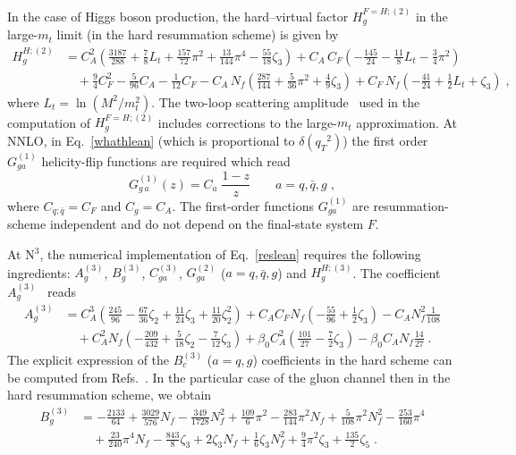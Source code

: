 \documentclass[12pt]{article}
\DeclareRobustCommand{\nn}{\nonumber}
\DeclareRobustCommand{\qt}{\ensuremath{q_T}\xspace}
\DeclareRobustCommand{\LO}{\text{LO}\xspace}
\DeclareRobustCommand{\N}[1]{\ensuremath{\text{N}^{#1}}} %
\begin{document}
\begin{appendix}
In the case of Higgs boson production, the hard--virtual factor $H^{F=H;(2)}_{g}$ in the large-$m_t$ limit (in the hard resummation scheme) is given by~\cite{Catani:2011kr}
\begin{align}
  H_g^{H;(2)} &=
  C_A^2 \left(
    \frac{3187}{288}+\frac{7}{8}L_t+\frac{157}{72}\pi^2+\frac{13}{144}\pi^4-\frac{55}{18}\zeta_3
  \right)
  +C_A\, C_F \left( -\frac{145}{24}-\frac{11}{8}L_t-\frac{3}{4}\pi^2\right)
  \nn\\&\quad
  +\frac{9}{4}C_F^2 -\frac{5}{96}C_A-\frac{1}{12}C_F-C_A\, N_f\left(\frac{287}{144}+\frac{5}{36}\pi^2+\frac{4}{9}\zeta_3\right)
  +C_F\, N_f\left(-\frac{41}{24}+\frac{1}{2}L_t+\zeta_3\right) \;,
  \label{H2g}
\end{align}
where $L_t=\ln (M^2/m_t^2)$. The two-loop scattering amplitude~\cite{Harlander:2009bw}  used in the computation of  $H^{F=H;(2)}_{g}$ includes corrections to the large-$m_t$ approximation.
At NNLO, in Eq.~\eqref{whathlean} (which is proportional to $\delta(\qt^{2})$) the first order $G_{ga}^{(1)}$ helicity-flip functions are required which read~\cite{Catani:2010pd}
\begin{equation}
  G_{g \,a}^{(1)}(z) = C_a \;\frac{1-z}{z} \qquad a=q,\bar{q},g \; ,
\end{equation}
where $C_{q;\bar{q}}=C_{F}$ and $C_g=C_{A}$. The first-order functions $G_{ga}^{(1)}$ are resummation-scheme independent and do not depend on the final-state system $F$.

At \N3\LO, the numerical implementation of Eq.~\eqref{reslean} requires the following ingredients: $A^{(3)}_{g}$, $B^{(3)}_{g}$, $C^{(3)}_{ga}$, $G^{(2)}_{ga}$ ($a=q,{\bar q},g$) and $H^{H;(3)}_{g}$. The coefficient $A_g^{(3)}$~\cite{Becher:2010tm} reads
\begin{align}
  A_g^{(3)} &=  
  C_A^3 \left( 
    \frac{245}{96} 
    - \frac{67}{36}\zeta_2
    + \frac{11}{24}\zeta_3 + \frac{11}{20}\zeta_2^2\right) 
    + C_A C_F N_f \left(-\frac{55}{96} 
    + \frac{1}{2}\zeta_3
  \right)
  -C_A N_f^2 \frac{1}{108} 
  \nn\\&\quad
  + C_A^2 N_f \left(
    - \frac{209}{432} 
    + \frac{5}{18}\zeta_2 
    - \frac{7}{12} \zeta_3
  \right)  
  + \beta_{0} C_A^2 \left(
    \frac{101}{27}
    -\frac{7}{2}\zeta_{3}
  \right)
  -\beta_{0} C_A N_f \frac{14}{27} \;.
  \label{acoeff}
\end{align}
The explicit expression of the $B_c^{(3)}$ ($a=q,g$) coefficients in the hard scheme can be computed from Refs.~\cite{Li:2016ctv,Vladimirov:2016dll}. In the particular case of the gluon channel then in the hard resummation scheme, we obtain
\begin{align}
  B_g^{(3)} &= 
  - \frac{2133}{64} 
  + \frac{3029}{576} N_{f} 
  - \frac{349}{1728} N_{f}^{2}  
  + \frac{109}{6} \pi^{2} 
  - \frac{283}{144} \pi^{2}  N_{f} 
  + \frac{5}{108} \pi^{2}  N_{f}^{2}
  -\frac{253}{160} \pi^{4}
  \nn\\&\quad
  +\frac{23}{240} \pi^{4} N_{f}
  -\frac{843}{8} \zeta_{3} 
  + 2 \zeta_{3} N_{f} 
  + \frac{1}{6} \zeta_{3} N_{f}^{2} 
  + \frac{9}{4} \pi^{2}  \zeta_{3} 
  + \frac{135}{2}  \zeta_{5} \;.
\end{align}



\end{appendix}
\end{document}
